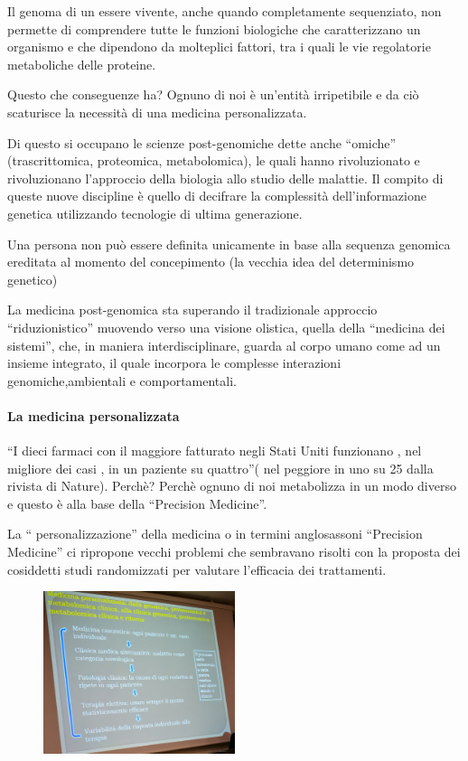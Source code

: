   Il genoma di un essere vivente, anche quando completamente
  sequenziato, non permette di comprendere tutte le funzioni biologiche
  che caratterizzano un organismo e che dipendono da molteplici fattori,
  tra i quali le vie regolatorie metaboliche delle proteine.

  Questo che conseguenze ha? Ognuno di noi è un'entità irripetibile e da
  ciò scaturisce la necessità di una medicina personalizzata.

  Di questo si occupano le scienze post-genomiche dette anche ``omiche''
  (trascrittomica, proteomica, metabolomica), le quali hanno
  rivoluzionato e rivoluzionano l'approccio della biologia allo studio
  delle malattie. Il compito di queste nuove discipline è quello di
  decifrare la complessità dell'informazione genetica utilizzando
  tecnologie di ultima generazione.

  Una persona non può essere definita unicamente in base alla sequenza
  genomica ereditata al momento del concepimento (la vecchia idea del
  determinismo genetico)

  La medicina post-genomica sta superando il tradizionale approccio
  ``riduzionistico'' muovendo verso una visione olistica, quella della
  ``medicina dei sistemi'', che, in maniera interdisciplinare, guarda al
  corpo umano come ad un insieme integrato, il quale incorpora le
  complesse interazioni genomiche,ambientali e comportamentali.

  \paragraph{La medicina personalizzata}

  ``I dieci farmaci con il maggiore fatturato negli Stati Uniti
  funzionano , nel migliore dei casi , in un paziente su quattro''( nel
  peggiore in uno su 25 dalla rivista di Nature). Perchè? Perchè ognuno
  di noi metabolizza in un modo diverso e questo è alla base della
  ``Precision Medicine''.

  La `` personalizzazione'' della medicina o in termini anglosassoni
  ``Precision Medicine'' ci ripropone vecchi problemi che sembravano
  risolti con la proposta dei cosiddetti studi randomizzati per valutare
  l'efficacia dei trattamenti.

  \begin{figure}[!ht]
\centering
	\includegraphics[width=0.5\textwidth]{33/image4.jpeg}
	\end{figure}

